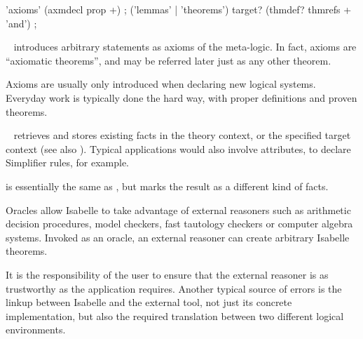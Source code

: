 \begin{isabellebody}
\begin{isamarkuptext}
  \begin{rail}
    'axioms' (axmdecl prop +)
    ;
    ('lemmas' | 'theorems') target? (thmdef? thmrefs + 'and')
    ;
  \end{rail}

  \begin{description}
  
  \item \hyperlink{command.axioms}{\mbox{}}~ introduces arbitrary
  statements as axioms of the meta-logic.  In fact, axioms are
  ``axiomatic theorems'', and may be referred later just as any other
  theorem.
  
  Axioms are usually only introduced when declaring new logical
  systems.  Everyday work is typically done the hard way, with proper
  definitions and proven theorems.
  
  \item \hyperlink{command.lemmas}{\mbox{}}~ retrieves and stores
  existing facts in the theory context, or the specified target
  context (see also ).  Typical applications would
  also involve attributes, to declare Simplifier rules, for example.
  
  \item \hyperlink{command.theorems}{\mbox{}} is essentially the same as \hyperlink{command.lemmas}{\mbox{}}, but marks the result as a different kind of facts.

  \end{description}%
\end{isamarkuptext}%
\isamarkuptrue%
%
\isamarkuptrue%
%
\begin{isamarkuptext}%
Oracles allow Isabelle to take advantage of external reasoners
  such as arithmetic decision procedures, model checkers, fast
  tautology checkers or computer algebra systems.  Invoked as an
  oracle, an external reasoner can create arbitrary Isabelle theorems.

  It is the responsibility of the user to ensure that the external
  reasoner is as trustworthy as the application requires.  Another
  typical source of errors is the linkup between Isabelle and the
  external tool, not just its concrete implementation, but also the
  required translation between two different logical environments.


\end{isamarkuptext}
\end{isabellebody}
